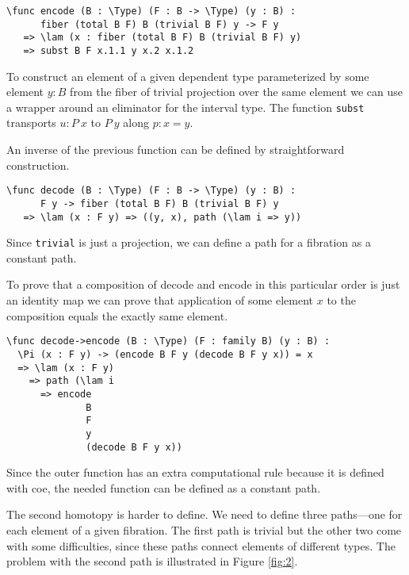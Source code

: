 \begin{ListingEnv}[H]
\begin{lstlisting}
\func encode (B : \Type) (F : B -> \Type) (y : B) :
      fiber (total B F) B (trivial B F) y -> F y
   => \lam (x : fiber (total B F) B (trivial B F) y)
   => subst B F x.1.1 y x.2 x.1.2
\end{lstlisting}
\end{ListingEnv}

To construct an element of a given dependent type parameterized by some element $y : B$ from the fiber of trivial projection over the same element we can use a wrapper around an eliminator for the interval type. The function \texttt{subst} transports $u : P\ x$ to $P\ y$ along $p : x = y$.

An inverse of the previous function can be defined by straightforward construction.

\begin{ListingEnv}[H]
\begin{lstlisting}
\func decode (B : \Type) (F : B -> \Type) (y : B) :
      F y -> fiber (total B F) B (trivial B F) y
   => \lam (x : F y) => ((y, x), path (\lam i => y))
\end{lstlisting}
\end{ListingEnv}

Since \texttt{trivial} is just a projection, we can define a path for a fibration as a constant path.

To prove that a composition of decode and encode in this particular order is just an identity map we can prove that application of some element $x$ to the composition equals the exactly same element.

\begin{ListingEnv}[H]
\begin{lstlisting}
\func decode->encode (B : \Type) (F : family B) (y : B) :
  \Pi (x : F y) -> (encode B F y (decode B F y x)) = x
  => \lam (x : F y)
    => path (\lam i
      => encode
              B
              F
              y
              (decode B F y x))
\end{lstlisting}
\end{ListingEnv}

Since the outer function has an extra computational rule because it is defined with coe, the needed function can be defined as a constant path.

The second homotopy is harder to define. We need to define three paths---one for each element of a given fibration. The first path is trivial but the other two come with some difficulties, since these paths connect elements of different types. The problem with the second path is illustrated in Figure \ref{fig:2}.

